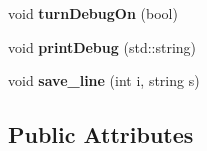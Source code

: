\begin{DoxyCompactItemize}
\item 
\hypertarget{classCCompiler_ab30f4e1937eaf5d6323a0504e756d963}{void {\bfseries turn\-Debug\-On} (bool)}\label{classCCompiler_ab30f4e1937eaf5d6323a0504e756d963}

\item 
\hypertarget{classCCompiler_a22ecc29706e555ac0f1e5c894cba905e}{void {\bfseries print\-Debug} (std\-::string)}\label{classCCompiler_a22ecc29706e555ac0f1e5c894cba905e}

\item 
\hypertarget{classCCompiler_a29d69476eff6dba6b2697b065b7fbc6b}{void {\bfseries save\-\_\-line} (int i, string s)}\label{classCCompiler_a29d69476eff6dba6b2697b065b7fbc6b}

\end{DoxyCompactItemize}
\subsection*{Public Attributes}
